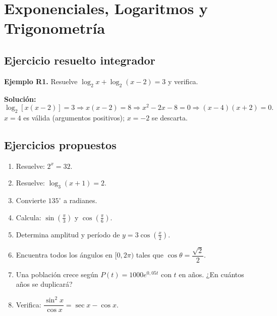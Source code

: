 \documentclass[12pt, a4paper]{article}
\begin{document}
\section{Exponenciales, Logaritmos y Trigonometría}

\subsection{Ejercicio resuelto integrador}

\textbf{Ejemplo R1.} Resuelve $\log_2 x + \log_2(x - 2) = 3$ y verifica.

\begin{cuadrosolucion}
  \textbf{Solución:}
  $$\log_2[x(x - 2)] = 3 \Rightarrow x(x - 2) = 8 \Rightarrow x^2 - 2x - 8 = 0 \Rightarrow (x - 4)(x + 2) = 0.$$
  $x = 4$ es válida (argumentos positivos); $x = -2$ se descarta.
\end{cuadrosolucion}

\subsection{Ejercicios propuestos}

\begin{enumerate}[leftmargin=*, resume]
  \item \facil{} Resuelve: $2^x = 32$.

  \item \facil{} Resuelve: $\log_3(x + 1) = 2$.

  \item \facil{} Convierte $135^\circ$ a radianes.

  \item \facil{} Calcula: $\sin\left(\frac{\pi}{3}\right)$ y $\cos\left(\frac{\pi}{6}\right)$.

  \item \medio{} Determina amplitud y período de $y = 3\cos\left(\frac{x}{2}\right)$.

  \item \medio{} Encuentra todos los ángulos en $[0, 2\pi)$ tales que $\cos\theta = \dfrac{\sqrt{2}}{2}$.

  \item \dificil{} Una población crece según $P(t) = 1000e^{0{,}05t}$ con $t$ en años. ¿En cuántos años se duplicará?

  \item \dificil{} Verifica: $\dfrac{\sin^2 x}{\cos x} = \sec x - \cos x$.
\end{enumerate}
\end{document}
